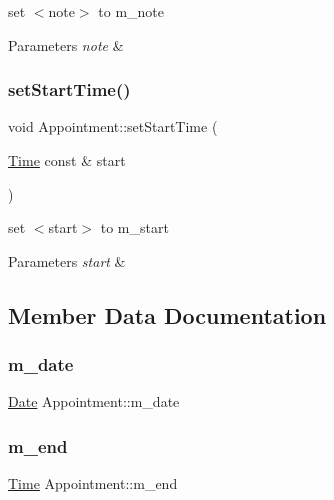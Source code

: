 set $<$note$>$ to m\+\_\+note 
\begin{DoxyParams}{Parameters}
{\em note} & \\
\hline
\end{DoxyParams}
\mbox{\label{classAppointment_ae0e33915a3e3d3af95c7e6180809e5fe}} 
\subsubsection{\texorpdfstring{set\+Start\+Time()}{setStartTime()}}
{\footnotesize\ttfamily void Appointment\+::set\+Start\+Time (\begin{DoxyParamCaption}\item[{\hyperlink{classTime}{Time} const \&}]{start }\end{DoxyParamCaption})}

set $<$start$>$ to m\+\_\+start 
\begin{DoxyParams}{Parameters}
{\em start} & \\
\hline
\end{DoxyParams}


\subsection{Member Data Documentation}
\mbox{\label{classAppointment_a0bba9cd4c7e3e9ca7d8faae5726b3a5d}} 
\subsubsection{\texorpdfstring{m\+\_\+date}{m\_date}}
{\footnotesize\ttfamily \hyperlink{classDate}{Date} Appointment\+::m\+\_\+date\hspace{0.3cm}{\ttfamily [private]}}

\mbox{\label{classAppointment_a95319a7575e4a9d428412868b7625544}} 
\subsubsection{\texorpdfstring{m\+\_\+end}{m\_end}}
{\footnotesize\ttfamily \hyperlink{classTime}{Time} Appointment\+::m\+\_\+end\hspace{0.3cm}{\ttfamily [private]}}

